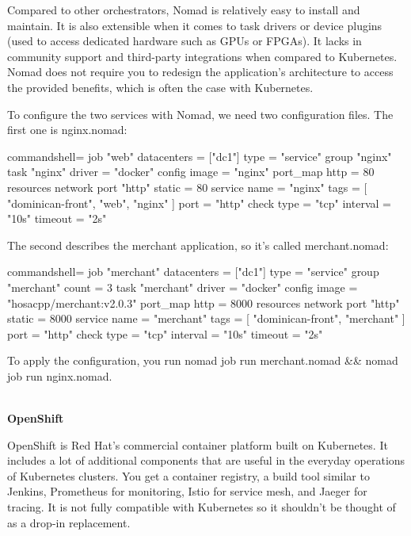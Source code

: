 Compared to other orchestrators, Nomad is relatively easy to install and maintain. It is also extensible when it comes to task drivers or device plugins (used to access dedicated hardware such as GPUs or FPGAs). It lacks in community support and third-party integrations when compared to Kubernetes. Nomad does not require you to redesign the application's architecture to access the provided benefits, which is often the case with Kubernetes.

To configure the two services with Nomad, we need two configuration files. The first one is nginx.nomad:

\begin{tcblisting}{commandshell={}}
job "web" {
  datacenters = ["dc1"]
  type = "service"
  group "nginx" {
    task "nginx" {
      driver = "docker"
      config {
        image = "nginx"
        port_map {
          http = 80
        }
      }
      resources {
        network {
          port "http" {
            static = 80
          }
        }
      }
      service {
        name = "nginx"
        tags = [ "dominican-front", "web", "nginx" ]
        port = "http"
        check {
          type = "tcp"
          interval = "10s"
          timeout = "2s"
        }
      }
    }
  }
}
\end{tcblisting}

The second describes the merchant application, so it's called merchant.nomad:

\begin{tcblisting}{commandshell={}}
job "merchant" {
  datacenters = ["dc1"]
  type = "service"
  group "merchant" {
    count = 3
    task "merchant" {
      driver = "docker"
      config {
        image = "hosacpp/merchant:v2.0.3"
        port_map {
          http = 8000
        }
      }
      resources {
        network {
          port "http" {
            static = 8000
          }
        }
      }
      service {
        name = "merchant"
        tags = [ "dominican-front", "merchant" ]
        port = "http"
        check {
          type = "tcp"
          interval = "10s"
          timeout = "2s"
        }
      }
    }
  }
}
\end{tcblisting}

To apply the configuration, you run nomad job run merchant.nomad \&\& nomad job run nginx.nomad.

\hspace*{\fill} \\ %
\noindent
\textbf{OpenShift}

OpenShift is Red Hat's commercial container platform built on Kubernetes. It includes a lot of additional components that are useful in the everyday operations of Kubernetes clusters. You get a container registry, a build tool similar to Jenkins, Prometheus for monitoring, Istio for service mesh, and Jaeger for tracing. It is not fully compatible with Kubernetes so it shouldn't be thought of as a drop-in replacement.

